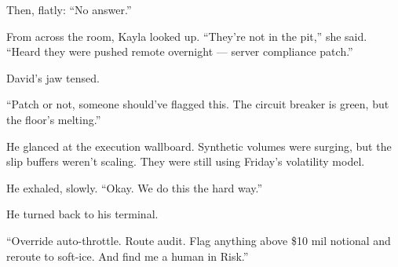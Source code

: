 Then, flatly: “No answer.”

From across the room, Kayla looked up.
“They’re not in the pit,” she said. “Heard they were pushed remote overnight — server compliance patch.”

David’s jaw tensed.

“Patch or not, someone should’ve flagged this. The circuit breaker is green, but the floor’s melting.”

He glanced at the execution wallboard. Synthetic volumes were surging, but the slip buffers weren’t scaling. They 
were still using Friday’s volatility model.

He exhaled, slowly. “Okay. We do this the hard way.”

He turned back to his terminal.

“Override auto-throttle. Route audit. Flag anything above \$10 mil notional and reroute to soft-ice. And find 
me a human in Risk.”

\medskip

